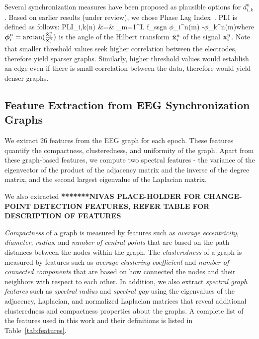 \documentclass{article} %
\newcommand{\vphi}{\mbox{\boldmath $\phi$\unboldmath}}
\begin{document}
Several synchronization measures have been proposed as plausible options for $d_{i,k}^{n}$.  Based on earlier results (under review), we chose Phase Lag Index~\cite{stam_pli}.  PLI is defined as follows:
\bea  
PLI_{i,k}(n)  &=&    \left\rvert\sum_{m=1}^{L f_s}\mbox{sgn}\lc
\vphi_i^{n}(m) -\vphi_k^{n}(m)\rc\right\rvert \eea  where $\vphi_{i}^{n} = \arctan({\frac{\hat{\vx}_{i}^{n}}{\vx_{i}^{n}}})$ is the angle of the Hilbert transform $\hat{{\bf x}}_{i}^{n}$ of the signal ${\bf x}_{i}^{n}$.  
Note that smaller threshold values seek higher correlation between the electrodes, therefore yield sparser graphs.  Similarly, higher threshold  values would establish an edge even if there is small correlation between the data, therefore would yield denser graphs.

\subsection{Feature Extraction from EEG Synchronization Graphs} \label{sec:graph_feats}
We extract $26$ features from the EEG  graph for each epoch.  These features quantify the compactness, clusteredness, and uniformity of
the graph.  Apart from these graph-based features, we compute two spectral features - the variance of the eigenvector of the product of the adjacency matrix and the inverse of the degree matrix, and the second largest eigenvalue of the Laplacian matrix.

We also extracted \textbf{*******NIVAS PLACE-HOLDER FOR CHANGE-POINT DETECTION FEATURES, REFER TABLE FOR DESCRIPTION OF FEATURES}

{\em Compactness} of a graph is measured by features such as {\em  average eccentricity},  {\em diameter},  {\em radius}, and {\em 
number of central points} that are based on the path distances between the nodes within the graph.  The {\em clusteredness} of a graph is
measured by features such  as {\em average clustering coefficient} and {\em number of  connected components} that are based  on how connected the  nodes  and  their  neighbors  with respect  to  each  other.  In addition, we also extract {\em spectral graph features} such as {\em
spectral radius} and {\em spectral gap} using the eigenvalues of the adjacency, Laplacian, and normalized Laplacian matrices that reveal
additional clusteredness and  compactness properties about the graphs.  A  complete  list  of  the  features  used  in  this  work  and  their
definitions is listed in Table~\ref{tab:features}.
\end{document}

